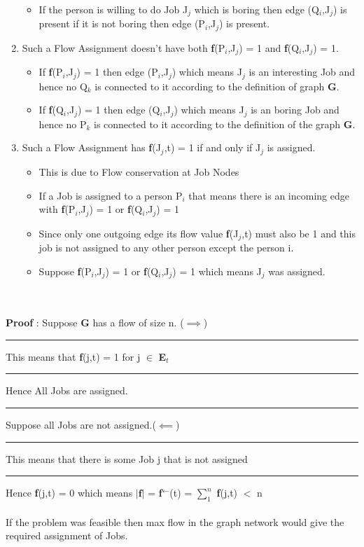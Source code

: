 \documentclass{report}
\begin{document}
\begin{enumerate}
\begin{itemize}
         \item If the person is willing to do Job J$_j$ which is boring then edge (Q$_i$,J$_j$) is present if it is not boring then edge (P$_i$,J$_j$) is present.
      \end{itemize}
     \item Such a Flow Assignment doesn't have both \textbf{f}(P$_i$,J$_j$) = 1 and \textbf{f}(Q$_i$,J$_j$) = 1.
     \begin{itemize}
         \item If \textbf{f}(P$_i$,J$_j$) = 1 then edge (P$_i$,J$_j$) which means J$_j$ is an interesting Job and hence no Q$_k$ is connected to it according to the definition of graph \textbf{G}.
         \item If \textbf{f}(Q$_i$,J$_j$) = 1 then edge (Q$_i$,J$_j$) which means J$_j$ is an boring Job and hence no P$_k$ is connected to it according to the definition of the graph \textbf{G}.
     \end{itemize}
     \item Such a Flow Assignment has \textbf{f}(J$_j$,t) = 1 if and only if J$_j$ is assigned.
     \begin{itemize}
         \item This is due to Flow conservation at Job Nodes
         \item If a Job is assigned to a person P$_i$ that means there is an incoming edge with \textbf{f}(P$_i$,J$_j$) = 1 or \textbf{f}(Q$_i$,J$_j$) = 1
         \item Since only one outgoing edge its flow value \textbf{f}(J$_j$,t) must also be 1 and this job is not assigned to any other person except the person i.
         \item Suppose \textbf{f}(P$_i$,J$_j$) = 1 or \textbf{f}(Q$_i$,J$_j$) = 1 which means J$_j$ was assigned.
     \end{itemize}
 \end{enumerate}
   \\
    \vspace*{0em}\\
 \textbf{Proof} : Suppose \textbf{G} has a flow of size n. ($\implies$)\vspace{0.5em}\\
 \rule[0.5mm]{1.1cm}{0pt} This means that \textbf{f}(j,t) = 1 for j $\in$ \textbf{E}$_t$\\
 \rule[0.5cm]{1.1cm}{0pt} Hence All Jobs are assigned.\\
 \rule[0.5cm]{1.1cm}{0pt} Suppose all Jobs are not assigned.($\impliedby$)\\
 \rule[0.5cm]{1.1cm}{0pt} This means that there is some Job j that is not assigned\\
 \rule[0.5cm]{1.1cm}{0pt} Hence \textbf{f}(j,t) = 0  which means $|\mathbf{f}|$ = \textbf{f}$^\gets$(t) = $\sum_1^n$ \textbf{f}(j,t) $<$ n\\
 \vspace*{0.5em}\\
 If the problem was feasible then max flow in the graph network would give the required assignment of Jobs.
\end{document}
